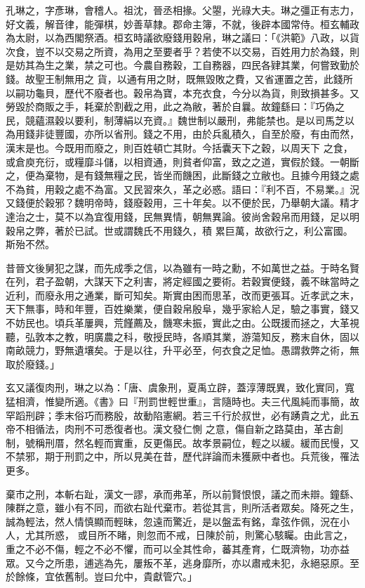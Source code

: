 \begin{pinyinscope}
 孔琳之，字彥琳，會稽人。祖沈，晉丞相掾。父曌，光祿大夫。琳之彊正有志力，好文義，解音律，能彈棋，妙善草隸。郡命主簿，不就，後辟本國常侍。桓玄輔政為太尉，以為西閣祭酒。桓玄時議欲廢錢用穀帛，琳之議曰：「《洪範》八政，以貨次食，豈不以交易之所資，為用之至要者乎？若使不以交易，百姓用力於為錢，則是妨其為生之業，禁之可也。今農自務穀，工自務器，四民各肄其業，何嘗致勤於錢。故聖王制無用之
 貨，以通有用之財，既無毀敗之費，又省運置之苦，此錢所以嗣功龜貝，歷代不廢者也。穀帛為寶，本充衣食，今分以為貨，則致損甚多。又勞毀於商販之手，耗棄於割截之用，此之為敝，著於自曩。故鐘繇曰：『巧偽之民，競蘊濕穀以要利，制薄絹以充資。』魏世制以嚴刑，弗能禁也。是以司馬芝以為用錢非徒豐國，亦所以省刑。錢之不用，由於兵亂積久，自至於廢，有由而然，漢末是也。今既用而廢之，則百姓頓亡其財。今括囊天下之穀，以周天下
 之食，或倉庾充衍，或糧靡斗儲，以相資通，則貧者仰富，致之之道，實假於錢。一朝斷之，便為棄物，是有錢無糧之民，皆坐而饑困，此斷錢之立敝也。且據今用錢之處不為貧，用穀之處不為富。又民習來久，革之必惑。語曰：『利不百，不易業。』況又錢便於穀邪？魏明帝時，錢廢穀用，三十年矣。以不便於民，乃舉朝大議。精才達治之士，莫不以為宜復用錢，民無異情，朝無異論。彼尚舍穀帛而用錢，足以明穀帛之弊，著於已試。世或謂魏氏不用錢久，積
 累巨萬，故欲行之，利公富國。斯殆不然。



 昔晉文後舅犯之謀，而先成季之信，以為雖有一時之勳，不如萬世之益。于時名賢在列，君子盈朝，大謀天下之利害，將定經國之要術。若穀實便錢，義不昧當時之近利，而廢永用之通業，斷可知矣。斯實由困而思革，改而更張耳。近孝武之末，天下無事，時和年豐，百姓樂業，便自穀帛殷阜，幾乎家給人足，驗之事實，錢又不妨民也。頃兵革屢興，荒饉薦及，饑寒未振，實此之由。公既援而拯之，大革視
 聽，弘敦本之教，明廣農之科，敬授民時，各順其業，游蕩知反，務末自休，固以南畝競力，野無遺壤矣。于是以往，升平必至，何衣食之足恤。愚謂救弊之術，無取於廢錢。」



 玄又議復肉刑，琳之以為：「唐、虞象刑，夏禹立辟，蓋淳薄既異，致化實同，寬猛相濟，惟變所適。《書》曰『刑罰世輕世重』，言隨時也。夫三代風純而事簡，故罕蹈刑辟；季末俗巧而務殷，故動陷憲網。若三千行於叔世，必有踴貴之尤，此五帝不相循法，肉刑不可悉復者也。漢文發仁惻
 之意，傷自新之路莫由，革古創制，號稱刑厝，然名輕而實重，反更傷民。故孝景嗣位，輕之以緩。緩而民慢，又不禁邪，期于刑罰之中，所以見美在昔，歷代詳論而未獲厥中者也。兵荒後，罹法更多。



 棄市之刑，本斬右趾，漢文一謬，承而弗革，所以前賢恨恨，議之而未辯。鐘繇、陳群之意，雖小有不同，而欲右趾代棄市。若從其言，則所活者眾矣。降死之生，誠為輕法，然人情慎顯而輕昧，忽遠而驚近，是以盤盂有銘，韋弦作佩，況在小人，尤其所惑，
 或目所不睹，則忽而不戒，日陳於前，則驚心駭矚。由此言之，重之不必不傷，輕之不必不懼，而可以全其性命，蕃其產育，仁既濟物，功亦益眾。又今之所患，逋逃為先，屢叛不革，逃身靡所，亦以肅戒未犯，永絕惡原。至於餘條，宜依舊制。豈曰允中，貴獻管穴。」




\end{pinyinscope}
